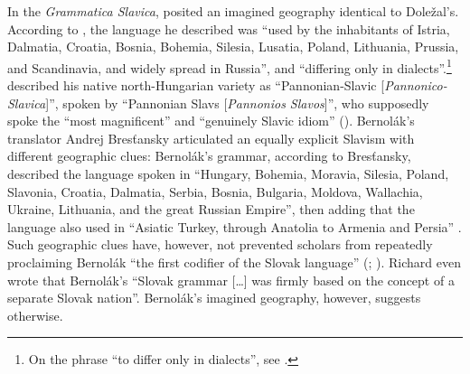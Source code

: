 In the \citeyear{bernolak_grammatica_1790} \textit{Grammatica Slavica}, \citeauthor{bernolak_grammatica_1790} posited an imagined geography identical to Doležal’s. According to \citet[v]{bernolak_grammatica_1790}, the language he described was “used by the inhabitants of Istria, Dalmatia, Croatia, Bosnia, Bohemia, Silesia, Lusatia, Poland, Lithuania, Prussia, and Scandinavia, and widely spread in Russia”, and “differing only in dialects”.\footnote{On the phrase “to differ only in dialects”, see \citet[95--109]{van_hal_differing_2017}.} \citet[3, 7, 36, 248, 269]{bernolak_grammatica_1790} described his native north-Hungarian variety as “Pannonian-Slavic [\textit{Pannonico-Slavica}]”, spoken by “Pannonian Slavs [\textit{Pannonios Slavos}]”, who supposedly spoke the \linebreak{}“most magnificent” and “genuinely Slavic idiom” (\citeyear[iv]{bernolak_grammatica_1790}). Bernolák’s translator Andrej Bresťansky articulated an equally explicit Slavism with different geographic clues: Bernolák’s grammar, according to Bresťansky, described the language spoken in “Hungary, Bohemia, Moravia, Silesia, Poland, Slavonia, Croatia, Dalmatia, Serbia, Bosnia, Bulgaria, Moldova, Wallachia, Ukraine, Lithuania, and the great Russian Empire”, then adding that the language also used in “Asiatic Turkey, through Anatolia to Armenia and Persia” \citep[i-ii (no page numbers)]{bernolak_schlowakische_1817}. Such geographic clues have, however, not prevented scholars from repeatedly proclaiming Bernolák “the first codifier of the Slovak language” (\cite[61]{sebik_strucne_1940}; \cite{kirschbaum_anton_1964}). Richard \citet[401]{auty_linguistic_1958} even wrote that Bernolák’s “Slovak grammar […] was firmly based on the concept of a separate Slovak nation”. Bernolák’s imagined geography, however, suggests otherwise.

